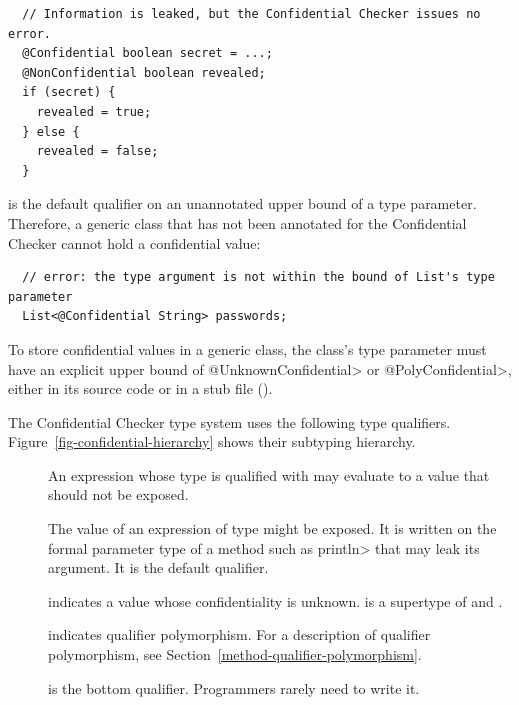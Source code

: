 \begin{Verbatim}
  // Information is leaked, but the Confidential Checker issues no error.
  @Confidential boolean secret = ...;
  @NonConfidential boolean revealed;
  if (secret) {
    revealed = true;
  } else {
    revealed = false;
  }
\end{Verbatim}



 is the default qualifier on an unannotated upper
bound of a type parameter.  Therefore, a generic class that has not been
annotated for the Confidential Checker cannot hold a confidential value:

\begin{Verbatim}
  // error: the type argument is not within the bound of List's type parameter
  List<@Confidential String> passwords;
\end{Verbatim}

To store confidential values in a generic class, the class's type parameter
must have an explicit upper bound of \<@UnknownConfidential> or
\<@PolyConfidential>, either in its source code or in a stub file
().



The Confidential Checker type system uses the following type qualifiers.
Figure~\ref{fig-confidential-hierarchy} shows their subtyping hierarchy.

\begin{description}
\item[]
    An expression whose type is qualified with
     may evaluate to
    a value that should not be exposed.
\item[]
    The value of an expression of type
     might be
    exposed.  It is written on the formal parameter type of a method such
    as \<println> that may leak its argument.  It is the default qualifier.
\item[]
    indicates a value whose confidentiality is unknown.
     is a supertype of 
    and .
\item[]
    indicates qualifier polymorphism. For a description of qualifier polymorphism,
    see Section~\ref{method-qualifier-polymorphism}.
\item[]
    is the bottom qualifier. Programmers rarely need to write it.
\end{description}


